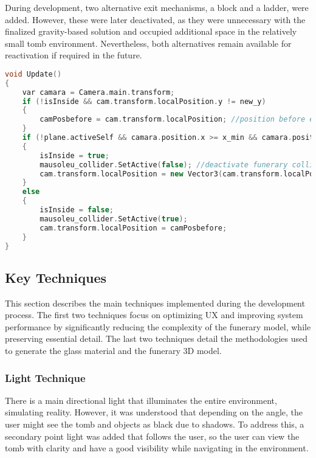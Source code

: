 During development, two alternative exit mechanisms, a block and a ladder, were added. However, these were later deactivated, as they were unnecessary with the finalized gravity-based solution and occupied additional space in the relatively small tomb environment. Nevertheless, both alternatives remain available for reactivation if required in the future.

\begin{lstlisting}[language=C++, caption={Vertical Descend approach in Update method().}, label={lst:vertical_descend}]
void Update()
{
    var camara = Camera.main.transform;
    if (!isInside && cam.transform.localPosition.y != new_y)
    {
        camPosbefore = cam.transform.localPosition; //position before entering the tomb
    }
    if (!plane.activeSelf && camara.position.x >= x_min && camara.position.x <= x_max && camara.position.z <= z_max && camara.position.z >= z_min && camara.position.y <= y_max && camara.position.y >= y_min) //check if position inside the tomb
    {
        isInside = true;
        mausoleu_collider.SetActive(false); //deactivate funerary collider
        cam.transform.localPosition = new Vector3(cam.transform.localPosition.x, new_y, cam.transform.localPosition.z); //user replaced to a lower position
    }
    else
    {
        isInside = false;
        mausoleu_collider.SetActive(true);
        cam.transform.localPosition = camPosbefore;
    }
}

\end{lstlisting}
\subsection{Key Techniques}
This section describes the main techniques implemented during the development process. 
The first two techniques focus on optimizing \gls{UX} and improving system performance by significantly reducing the complexity of the funerary model, while preserving essential detail. 
The last two techniques detail the methodologies used to generate the glass material and the funerary \gls{3D} model.
\subsubsection{Light Technique}
There is a main directional light that illuminates the entire environment, simulating reality. 
However, it was understood that depending on the angle, the user might see the tomb and objects as black due to shadows. To address this, a secondary point light was added that follows the user, so the user can view the tomb with clarity and have a good visibility while navigating in the environment.

